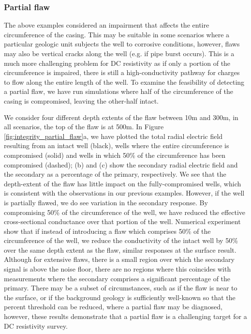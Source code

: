 







\subsubsection{Partial flaw}
The above examples considered an impairment that affects the entire circumference of the casing. This may be suitable in some scenarios where a particular geologic unit subjects the well to corrosive conditions, however, flaws may also be vertical cracks along the well (e.g. if pipe burst occurs). This is a much more challenging problem for DC resistivity as if only a portion of the circumference is impaired, there is still a high-conductivity pathway for charges to flow along the entire length of the well. To examine the feasibility of detecting a partial flaw, we have run simulations where half of the circumference of the casing is compromised, leaving the other-half intact.

We consider four different depth extents of the flaw between 10m and 300m, in all scenarios, the top of the flaw is at 500m. In Figure \ref{fig:integrity_partial_flaw}a, we have plotted the total radial electric field resulting from an intact well (black), wells where the entire circumference is compromised (solid) and wells in which 50\% of the circumference has been compromised (dashed); (b) and (c) show the secondary radial electric field and the secondary as a percentage of the primary, respectively. We see that the depth-extent of the flaw has little impact on the fully-compromised wells, which is consistent with the observations in our previous examples. However, if the well is partially flawed, we do see variation in the secondary response. By compromising 50\% of the circumference of the well, we have reduced the effective cross-sectional conductance over that portion of the well. Numerical experiment show that if instead of introducing a flaw which comprises 50\% of the circumference of the well, we reduce the conductivity of the intact well by 50\% over the same depth extent as the flaw, similar responses at the surface result. Although for extensive flaws, there is a small region over which the secondary signal is above the noise floor, there are no regions where this coincides with measurements where the secondary comprises a significant percentage of the primary. There may be a subset of circumstances, such as if the flaw is near to the surface, or if the background geology is sufficiently well-known so that the percent threshold can be reduced, where a partial flaw may be diagnosed, however, these results demonstrate that a partial flaw is a challenging target for a DC resistivity survey.


